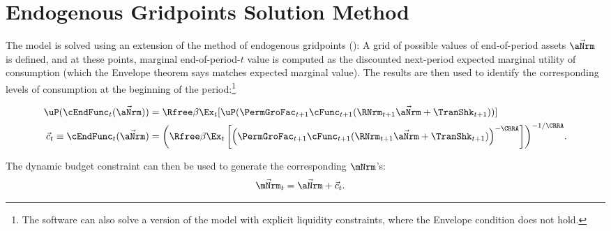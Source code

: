 \documentclass[\econtexRoot/Endo]{subfiles}
\begin{document}
\section{Endogenous Gridpoints Solution Method}\label{sec:ApndxSolnMethEndogGpts}

The model is solved using an extension of the method of endogenous gridpoints (\cite{carrollEGM}): A grid of possible values of end-of-period assets $\vec{\aNrm}$ is defined, and at these points, marginal end-of-period-$t$ value is computed as the discounted next-period expected marginal utility of consumption (which the Envelope theorem says matches expected marginal value).  The results are then used to identify the corresponding levels of consumption at the beginning of the period:\footnote{The software can also solve a version of the model with explicit liquidity constraints, where the Envelope condition does not hold.}

\begin{equation}\begin{gathered}\begin{aligned}
  \uP(\cEndFunc_{t}(\vec{\aNrm}))  & = \Rfree \beta \Ex_{t}[ \uP(\PermGroFac_{t+1}
  \cFunc_{t+1}(\RNrm_{t+1}\vec{\aNrm} + \TranShk_{t+1}))] \label{eq:cEulerEndog}
\\ \vec{c}_{t} \equiv \cEndFunc_{t}(\vec{\aNrm})  & = {\left(\Rfree \beta \Ex_{t}\left[ {\left(\PermGroFac_{t+1}
      \cFunc_{t+1}(\RNrm_{t+1}\vec{\aNrm} +
      \TranShk_{t+1})\right)}^{-\CRRA}\right]\right)}^{-1/\CRRA}. \notag
\end{aligned}\end{gathered}\end{equation}

The dynamic budget constraint can then be used to generate the corresponding $\mNrm$'s:
\begin{eqnarray*}
  \vec{\mNrm}_{t}  & = \vec{\aNrm}+\vec{c}_{t}.
\end{eqnarray*}
\end{document}
